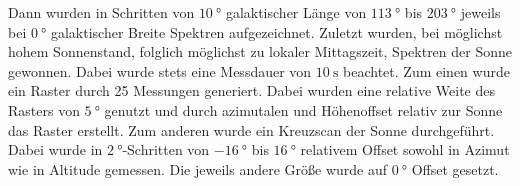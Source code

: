 Dann wurden in Schritten von $\SI{10}{\degree}$ galaktischer Länge von $\SI{113}{\degree}$ bis $\SI{203}{\degree}$ jeweils bei $\SI{0}{\degree}$ galaktischer Breite Spektren aufgezeichnet.
Zuletzt wurden, bei möglichst hohem Sonnenstand, folglich möglichst zu lokaler Mittagszeit, Spektren der Sonne gewonnen.
Dabei wurde stets eine Messdauer von $\SI{10}{\second}$ beachtet.
Zum einen wurde ein Raster durch 25 Messungen generiert.
Dabei wurden eine relative Weite des Rasters von $\SI{5}{\degree}$ genutzt und durch azimutalen und Höhenoffset relativ zur Sonne das Raster erstellt.
Zum anderen wurde ein Kreuzscan der Sonne durchgeführt.
Dabei wurde in $\SI{2}{\degree}$-Schritten von $\SI{-16}{\degree}$ bis $\SI{16}{\degree}$ relativem Offset sowohl in Azimut wie in Altitude gemessen. Die jeweils andere Größe wurde auf $\SI{0}{\degree}$ Offset gesetzt.